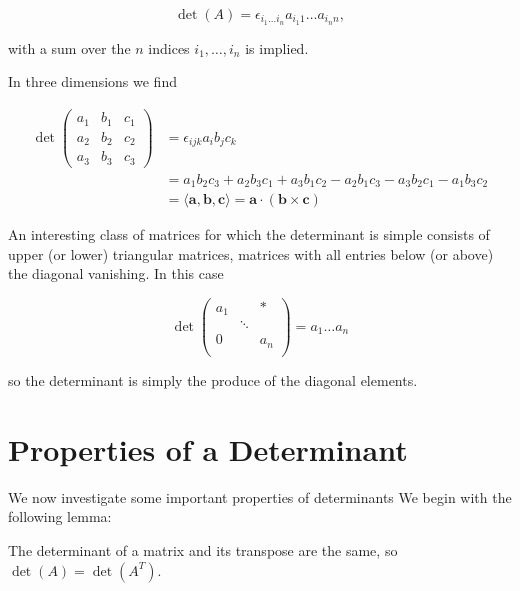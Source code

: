 \documentclass[a4paper,12pt]{report}
\begin{document}
\begin{equation}
    \det(A) = \epsilon_{i_1 \ldots  i_n} a_{i_1 1} \ldots  a_{i_n n},
\end{equation}
    
with a sum over the \( n \) indices \( i_1, \ldots, i_n \) is implied.

In three dimensions we find 

\begin{equation}
    \begin{aligned}
        \det \begin{pmatrix} 
        a_1 & b_1 & c_1 \\ 
        a_2 & b_2 & c_2 \\ 
        a_3 & b_3 & c_3 
        \end{pmatrix} 
        &= \epsilon_{ijk} a_i b_j c_k \\ 
        &= a_1 b_2 c_3 + a_2 b_3 c_1 + a_3 b_1 c_2 - a_2 b_1 c_3 - a_3 b_2 c_1 - a_1 b_3 c_2 \\
        &= \langle \mathbf{a}, \mathbf{b}, \mathbf{c} \rangle = \mathbf{a} \cdot (\mathbf{b} \times \mathbf{c})
    \end{aligned}
\end{equation}

An interesting class of matrices for which the determinant is simple consists of upper (or lower) triangular matrices, \ie matrices with all entries below (or above) the diagonal vanishing. In this case

\begin{equation}
    \det \begin{pmatrix}
        a_1  &  & *  \\
         & \ddots  &   \\
        0 &  & a_{n}   \\
    \end{pmatrix} = a_1 \ldots a_{n} 
\end{equation}

so the determinant is simply the produce of the diagonal elements.

\section{Properties of a Determinant} \label{detprop} 

We now investigate some important properties of determinants We begin with the following lemma:


\begin{lemma}
The determinant of a matrix and its transpose are the same, so $\det(A) = \det(A^T)$.
\end{lemma}
\end{document}
